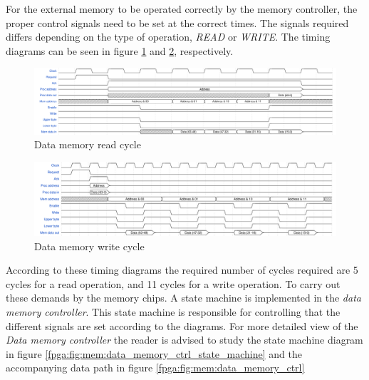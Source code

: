 For the external memory to be operated correctly by the memory controller, the proper control signals need to be set at the correct times. The signals required differs depending on the type of operation, \emph{READ} or \emph{WRITE}. The timing diagrams can be seen in figure \ref{fpga:fig:timing:dmem:read} and \ref{fpga:fig:timing:dmem:write}, respectively. 


\begin{figure}[H]
  \centering
  \includegraphics[width=\textwidth]{fpga/fig/timing/data_mem_read.pdf}
  \caption{Data memory read cycle}
  \label{fpga:fig:timing:dmem:read}
\end{figure}

\begin{figure}[H]
  \centering
  \includegraphics[width=\textwidth]{fpga/fig/timing/data_mem_write.pdf}
  \caption{Data memory write cycle}
  \label{fpga:fig:timing:dmem:write}
\end{figure}

According to these timing diagrams the required number of cycles required are 5 cycles for a read operation, and 11 cycles for a write operation. To carry out these demands by the memory chips. A state machine is implemented in the \emph{data memory controller}. This state machine is responsible for controlling that the different signals are set according to the diagrams. For more detailed view of the \emph{Data memory controller} the reader is advised to study the state machine diagram in figure \ref{fpga:fig:mem:data_memory_ctrl_state_machine} and the accompanying data path in figure \ref{fpga:fig:mem:data_memory_ctrl}



